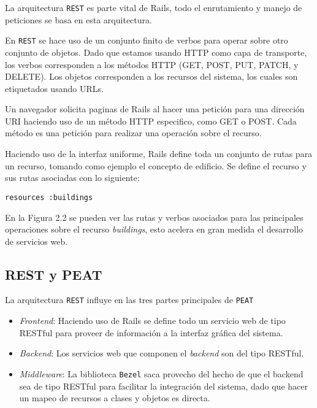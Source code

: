 La arquitectura \texttt{REST} es parte vital de Rails, todo el enrutamiento y
manejo de peticiones se basa en esta arquitectura.

En \texttt{REST} se hace uso de un conjunto finito de verbos para operar sobre otro
conjunto de objetos. Dado que estamos usando HTTP como capa de transporte, los
verbos corresponden a los métodos HTTP (GET, POST, PUT, PATCH, y DELETE).
Los objetos corresponden a los recursos del sistema, los cuales son etiquetados
usando URLs.

Un navegador solicita paginas de Rails al hacer una petición para una dirección URI
haciendo uso de un método HTTP especifico, como GET o POST. Cada método es una
petición para realizar una operación sobre el recurso.

Haciendo uso de la interfaz uniforme, Rails define toda un conjunto de rutas
para un recurso, tomando como ejemplo el concepto de edificio. Se define
el recurso y sus rutas asociadas con lo siguiente:

\begin{verbatim}
resources :buildings
\end{verbatim}

En la Figura 2.2 se pueden ver las rutas y verbos asociados para las principales
operaciones sobre el recurso \textit{buildings}, esto acelera en gran medida
el desarrollo de servicios web.


\subsection{REST y PEAT}
La arquitectura \texttt{REST} influye en las tres partes principales de \texttt{PEAT}

\begin{itemize}
\item \textit{Frontend}: Haciendo uso de Rails se define todo un servicio web de tipo
  RESTful para proveer de información a la interfaz gráfica del sistema.
\item \textit{Backend}: Los servicios web que componen el \textit{backend} son
  del tipo RESTful.
\item \textit{Middleware}: La biblioteca \texttt{Bezel} saca provecho del hecho
  de que el backend sea de tipo RESTful para facilitar la integración del sistema,
  dado que hacer un mapeo de recursos a clases y objetos es directa.

\end{itemize}
